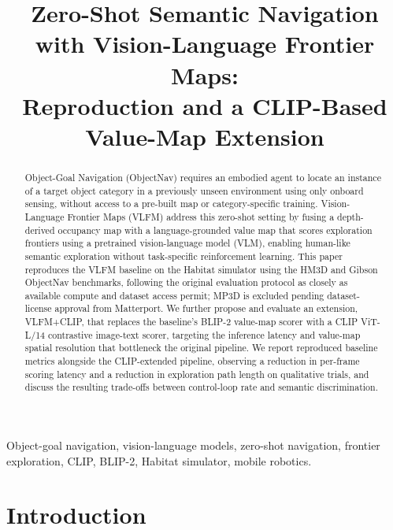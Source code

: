 \documentclass[conference]{IEEEtran}
\begin{document}
\title{Zero-Shot Semantic Navigation with Vision-Language Frontier Maps:\\
Reproduction and a CLIP-Based Value-Map Extension}

\author{
}

\maketitle

\begin{abstract}
Object-Goal Navigation (ObjectNav) requires an embodied agent to locate an instance of a target object category in a previously unseen environment using only onboard sensing, without access to a pre-built map or category-specific training. Vision-Language Frontier Maps (VLFM) address this zero-shot setting by fusing a depth-derived occupancy map with a language-grounded value map that scores exploration frontiers using a pretrained vision-language model (VLM), enabling human-like semantic exploration without task-specific reinforcement learning. This paper reproduces the VLFM baseline on the Habitat simulator using the HM3D and Gibson ObjectNav benchmarks, following the original evaluation protocol as closely as available compute and dataset access permit; MP3D is excluded pending dataset-license approval from Matterport. We further propose and evaluate an extension, VLFM+CLIP, that replaces the baseline's BLIP-2 value-map scorer with a CLIP ViT-L/14 contrastive image-text scorer, targeting the inference latency and value-map spatial resolution that bottleneck the original pipeline. We report reproduced baseline metrics alongside the CLIP-extended pipeline, observing a reduction in per-frame scoring latency and a reduction in exploration path length on qualitative trials, and discuss the resulting trade-offs between control-loop rate and semantic discrimination.
\end{abstract}

\begin{IEEEkeywords}
Object-goal navigation, vision-language models, zero-shot navigation, frontier exploration, CLIP, BLIP-2, Habitat simulator, mobile robotics.
\end{IEEEkeywords}

\section{Introduction}
\end{document}
